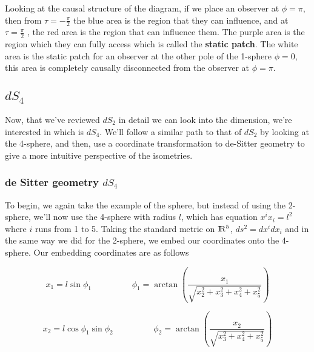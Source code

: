\documentclass[a4paper,11pt]{article}
\numberwithin{equation}{section}
\numberwithin{figure}{section}
\begin{document}
\begin{large}
\begin{figure}[h]
\end{figure}


Looking at the causal structure of the diagram, if we place an observer at $\phi=\pi$, then from $\tau=-\frac{\pi}{2}$ the blue area is the region that they can influence, and at $\tau=\frac{\pi}{2}$ , the red area is the region that can influence them. The purple area is the region which they can fully access which is called the 
\textbf{static patch}. The white area is the static patch for an observer at the other pole of the 1-sphere $\phi=0$, this area is completely causally disconnected from the observer at $\phi=\pi$.

\vspace{0.5cm}

\subsection{$dS_4$}


Now, that we've reviewed $dS_2$ in detail we can look into the dimension, we're interested in which is $dS_4$. We'll follow a similar path to that of $dS_2$ by looking at the 4-sphere, and then, use a coordinate transformation to de-Sitter geometry to give a more intuitive perspective of the isometries.


\subsubsection{de Sitter geometry $dS_4$}

To begin, we again take the example of the sphere, but instead of using the 2-sphere, we'll now use the 4-sphere with radius $l$, which has equation $x^ix_i=l^2$ where $i$ runs from 1 to 5. Taking the standard metric on $\rm I\!R^5$, $ds^2=dx^i dx_i$ and in the same way we did for the 2-sphere, we embed our coordinates onto the 4-sphere. Our embedding coordinates are as follows

\begin{equation}
\label{eq:embed 4-sphere1}    
    x_1= l \sin \phi_1 \hspace{2cm} \phi_1=\arctan \left( \frac{x_1}{\sqrt{x_2^2+x_3^2+x_4^2+x_5^2}} \right)
\end{equation}

\begin{equation}
\label{eq:embed 4-sphere2}    
    x_2= l \cos \phi_1 \sin \phi_2 \hspace{2cm} \phi_2=\arctan \left( \frac{x_2}{\sqrt{x_3^2+x_4^2+x_5^2}} \right)
\end{equation}


\end{large}
\end{document}
